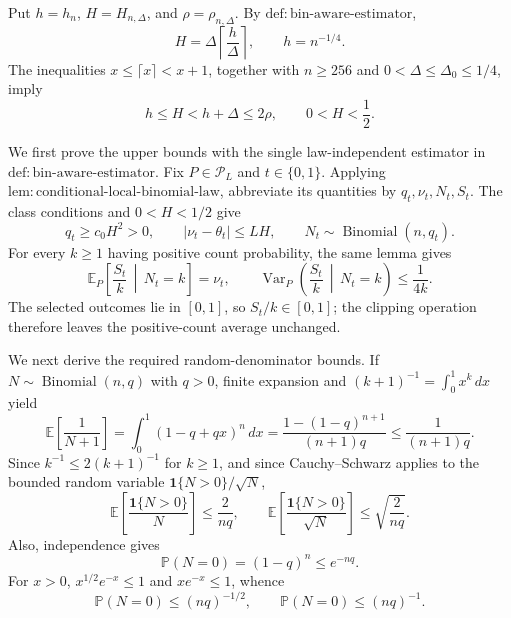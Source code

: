 Put \(h=h_n\), \(H=H_{n,\Delta}\), and \(\rho=\rho_{n,\Delta}\).  By \(\mathrm{def:bin\text{-}aware\text{-}estimator}\),
\[
 H=\Delta\left\lceil\frac h\Delta\right\rceil,
 \qquad h=n^{-1/4}.
\]
The inequalities \(x\leq\lceil x\rceil<x+1\), together with \(n\geq256\) and \(0<\Delta\leq\Delta_0\leq1/4\), imply
\[
 h\leq H<h+\Delta\leq2\rho,
 \qquad 0<H<\frac12.
\]

We first prove the upper bounds with the single law-independent estimator in \(\mathrm{def:bin\text{-}aware\text{-}estimator}\).  Fix \(P\in\mathcal P_L\) and \(t\in\{0,1\}\).  Applying \(\mathrm{lem:conditional\text{-}local\text{-}binomial\text{-}law}\), abbreviate its quantities by \(q_t,\nu_t,N_t,S_t\).  The class conditions and \(0<H<1/2\) give
\[
 q_t\geq c_0H^2>0,
 \qquad |\nu_t-\theta_t|\leq LH,
 \qquad N_t\sim\operatorname{Binomial}(n,q_t).
\]
For every \(k\geq1\) having positive count probability, the same lemma gives
\[
 \mathbb E_P\!\left[\frac{S_t}{k}\,\middle|\,N_t=k\right]=\nu_t,
 \qquad
 \operatorname{Var}_P\!\left(\frac{S_t}{k}\,\middle|\,N_t=k\right)\leq\frac1{4k}.
\]
The selected outcomes lie in \([0,1]\), so \(S_t/k\in[0,1]\); the clipping operation therefore leaves the positive-count average unchanged.

We next derive the required random-denominator bounds.  If \(N\sim\operatorname{Binomial}(n,q)\) with \(q>0\), finite expansion and \((k+1)^{-1}=\int_0^1x^k\,dx\) yield
\[
 \mathbb E\!\left[\frac1{N+1}\right]
 =\int_0^1(1-q+qx)^n\,dx
 =\frac{1-(1-q)^{n+1}}{(n+1)q}
 \leq\frac1{(n+1)q}.
\]
Since \(k^{-1}\leq2(k+1)^{-1}\) for \(k\geq1\), and since Cauchy--Schwarz applies to the bounded random variable \(\mathbf1\{N>0\}/\sqrt N\),
\[
 \mathbb E\!\left[\frac{\mathbf1\{N>0\}}N\right]
 \leq\frac2{nq},
 \qquad
 \mathbb E\!\left[\frac{\mathbf1\{N>0\}}{\sqrt N}\right]
 \leq\sqrt{\frac2{nq}}.
\]
Also, independence gives
\[
 \mathbb P(N=0)=(1-q)^n\leq e^{-nq}.
\]
For \(x>0\), \(x^{1/2}e^{-x}\leq1\) and \(xe^{-x}\leq1\), whence
\[
 \mathbb P(N=0)\leq(nq)^{-1/2},
 \qquad
 \mathbb P(N=0)\leq(nq)^{-1}.
\]

